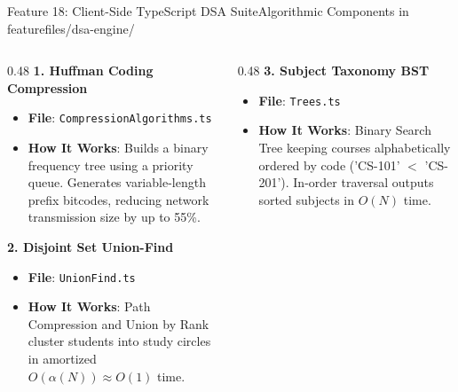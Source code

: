 \documentclass[aspectratio=169,10pt]{beamer}
\begin{document}
\begin{frame}[t]{Feature 18: Client-Side TypeScript DSA Suite}{Algorithmic Components in featurefiles/dsa-engine/}
  \begin{columns}[t]
    \begin{column}{0.48\textwidth}
      {\fontsize{9.0}{11.0}\selectfont\textbf{\textcolor{KoinexaRed}{1. Huffman Coding Compression}}}\par\vspace{1.5pt}
      \begin{itemize}\setlength{\itemsep}{1.2pt}
        \item {\fontsize{8.0}{9.8}\selectfont \textbf{File}: \texttt{CompressionAlgorithms.ts}}
        \item {\fontsize{8.0}{9.8}\selectfont \textbf{How It Works}: Builds a binary frequency tree using a priority queue. Generates variable-length prefix bitcodes, reducing network transmission size by up to 55\%.}
      \end{itemize}
      \vspace{0.2cm}
      {\fontsize{9.0}{11.0}\selectfont\textbf{\textcolor{KoinexaOrange}{2. Disjoint Set Union-Find}}}\par\vspace{1.5pt}
      \begin{itemize}\setlength{\itemsep}{1.2pt}
        \item {\fontsize{8.0}{9.8}\selectfont \textbf{File}: \texttt{UnionFind.ts}}
        \item {\fontsize{8.0}{9.8}\selectfont \textbf{How It Works}: Path Compression and Union by Rank cluster students into study circles in amortized $O(\alpha(N)) \approx O(1)$ time.}
      \end{itemize}
    \end{column}
    \begin{column}{0.48\textwidth}
      {\fontsize{9.0}{11.0}\selectfont\textbf{\textcolor{KoinexaRed}{3. Subject Taxonomy BST}}}\par\vspace{1.5pt}
      \begin{itemize}\setlength{\itemsep}{1.2pt}
        \item {\fontsize{8.0}{9.8}\selectfont \textbf{File}: \texttt{Trees.ts}}
        \item {\fontsize{8.0}{9.8}\selectfont \textbf{How It Works}: Binary Search Tree keeping courses alphabetically ordered by code ('CS-101' $<$ 'CS-201'). In-order traversal outputs sorted subjects in $O(N)$ time.}

\end{itemize}
\end{column}
\end{columns}
\end{frame}
\end{document}
